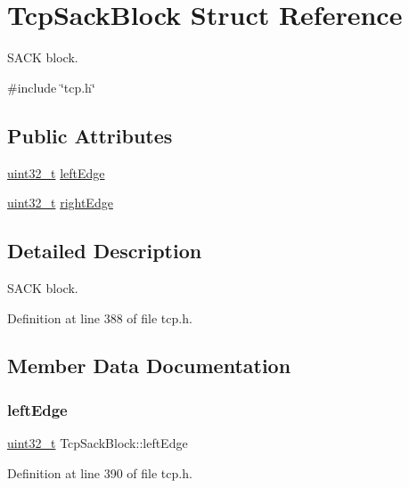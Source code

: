 \hypertarget{structTcpSackBlock}{}\section{Tcp\+Sack\+Block Struct Reference}
\label{structTcpSackBlock}


S\+A\+CK block.  




{\ttfamily \#include \char`\"{}tcp.\+h\char`\"{}}

\subsection*{Public Attributes}
\begin{DoxyCompactItemize}
\item 
\hyperlink{stdint_8h_a435d1572bf3f880d55459d9805097f62}{uint32\+\_\+t} \hyperlink{structTcpSackBlock_ac8c3986e2ad25f9f8acf61e367462b48}{left\+Edge}
\item 
\hyperlink{stdint_8h_a435d1572bf3f880d55459d9805097f62}{uint32\+\_\+t} \hyperlink{structTcpSackBlock_aa2eb00a549d96b0ccf7d49a164df50ff}{right\+Edge}
\end{DoxyCompactItemize}


\subsection{Detailed Description}
S\+A\+CK block. 

Definition at line 388 of file tcp.\+h.



\subsection{Member Data Documentation}
\mbox{\label{structTcpSackBlock_ac8c3986e2ad25f9f8acf61e367462b48}} 
\subsubsection{\texorpdfstring{left\+Edge}{leftEdge}}
{\footnotesize\ttfamily \hyperlink{stdint_8h_a435d1572bf3f880d55459d9805097f62}{uint32\+\_\+t} Tcp\+Sack\+Block\+::left\+Edge}



Definition at line 390 of file tcp.\+h.

